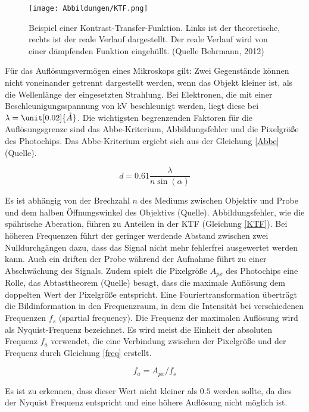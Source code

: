 \begin{figure}[h!]
\texttt{[image: Abbildungen/KTF.png]}
\caption[Beispiel einer Kontrast-Transfer-Funktion]{Beispiel einer Kontrast-Transfer-Funktion. Links ist der theoretische, rechts ist der reale Verlauf dargestellt. Der reale Verlauf wird von einer  dämpfenden Funktion eingehüllt. (Quelle Behrmann,
2012)}
\end{figure}

Für das Auflösungsvermögen eines Mikroskops gilt: Zwei Gegenstände können nicht voneinander getrennt dargestellt werden, wenn das Objekt kleiner ist, als die Wellenlänge der eingesetzten Strahlung.
Bei Elektronen, die mit einer Beschleunigungsspannung von \unit[300]{kV} beschleunigt werden, liegt diese bei $\lambda = \unit[0.02]{\mathring{A}}$.
Die wichtigsten begrenzenden Faktoren für die Auflösungsgrenze sind das Abbe-Kriterium, Abbildungsfehler und die Pixelgröße des Photochips.
Das Abbe-Kriterium ergiebt sich aus der Gleichung \eqref{Abbe} (Quelle).

\begin{equation}
	d = 0.61 \frac{\lambda}{n \sin(\alpha)} \label{Abbe}
\end{equation}

Es ist abhängig von der Brechzahl $n$ des Mediums zwischen Objektiv und Probe und dem halben Öffnungswinkel des Objektivs (Quelle).
Abbildungsfehler, wie die spährische Aberation, führen zu Anteilen in der KTF (Gleichung \eqref{KTF}).
Bei höheren Frequenzen führt der geringer werdende Abstand zwischen zwei Nulldurchgängen dazu, dass das Signal nicht mehr fehlerfrei ausgewertet werden kann.
Auch ein driften der Probe während der Aufnahme führt zu einer Abschwächung des Signals.
Zudem spielt die Pixelgröße $A_{px}$ des Photochips eine Rolle, das Abtasttheorem (Quelle) besagt, dass die maximale Auflösung dem doppelten Wert der Pixelgröße entspricht.
Eine Fouriertransformation überträgt die Bildinformation in den Frequenzraum, in dem die Intensität bei verschiedenen Frequenzen $f_s$ (spartial frequency).
Die Frequenz der maximalen Auflösung wird als Nyquist-Frequenz bezeichnet.
Es wird meist die Einheit der absoluten Frequenz $f_a$ verwendet, die eine Verbindung zwischen der Pixelgröße und der Frequenz durch Gleichung \eqref{freq} erstellt.

\begin{equation}
	f_a = A_{px} / f_s \label{freq}
\end{equation}

Es ist zu erkennen, dass dieser Wert nicht kleiner als $0.5$ werden sollte, da dies der Nyquist Frequenz entspricht und eine höhere Auflösung nicht möglich ist.

\FloatBarrier